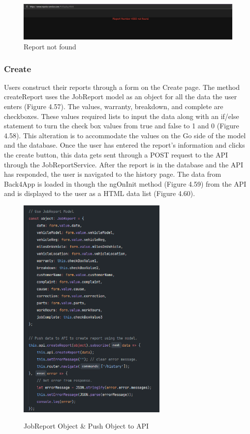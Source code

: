 \begin{figure}[H]
    \caption{Report not found}
    \label{image:ReportNotFound}
    \centering
    \includegraphics[width=1.0\textwidth]{images/repota/UI/report_not_found.png}
\end{figure}

\subsubsection{Create}
Users construct their reports through a form on the Create page. The method createReport uses the JobReport model as an object for all the data the user enters (Figure 4.57). The values, warranty, breakdown, and complete are checkboxes. These values required lists to input the data along with an if/else statement to turn the check box values from true and false to 1 and 0 (Figure 4.58). This alteration is to accommodate the values on the Go side of the model and the database. Once the user has entered the report's information and clicks the create button, this data gets sent through a POST request to the API through the JobReportService. After the report is in the database and the API has responded, the user is navigated to the history page. The data from Back4App is loaded in though the ngOnInit method (Figure 4.59) from the API and is displayed to the user as a HTML data list (Figure 4.60).  

\begin{figure}[H]
    \centering
    \caption{JobReport Object \& Push Object to API}
    \includegraphics[width=0.65\textwidth]{images/repota/report_pages/create_2.png}
    \label{image:createReportObject}
    \centering
\end{figure}

